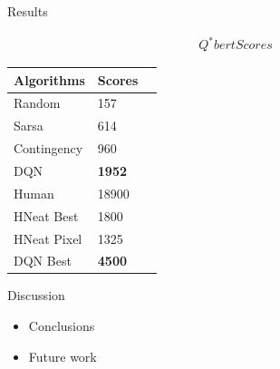 \documentclass[final]{beamer}
\newlength{\onecolwid}
\begin{document}
\begin{frame}[t]
\begin{columns}[t]
\begin{column}{\onecolwid} %


\begin{block}{Results}

\begin{gather*}
	Q^{\ast}bert Scores
\end{gather*}

\begin{table}
    \vspace{2ex}
    \begin{tabular}{l l l}
        \toprule
            \textbf{Algorithms} & \textbf{Scores} \\
        \midrule
            Random & 157 \\
            Sarsa & 614 \\
            Contingency & 960 \\
            DQN & \textbf{1952} \\
            Human & 18900 \\
        \midrule
            HNeat Best & 1800 \\
            HNeat Pixel & 1325 \\
            DQN Best & \textbf{4500} \\
        \bottomrule
    \end{tabular}
\end{table}

\end{block}


\begin{block}{Discussion}

    \begin{itemize}
        \item Conclusions
        \item Future work
    \end{itemize}

\end{block}


\end{column} %

\end{columns} %

\end{frame} %
\end{document}

